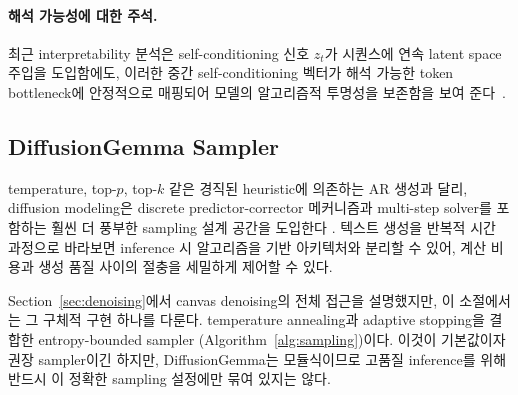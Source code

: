 \documentclass[11pt, a4paper, logo, copyright, gdm]{google}
\begin{document}
\paragraph{해석 가능성에 대한 주석.} 최근 interpretability 분석은 self-conditioning 신호 $z_t$가 시퀀스에 연속 latent space 주입을 도입함에도, 이러한 중간 self-conditioning 벡터가 해석 가능한 token bottleneck에 안정적으로 매핑되어 모델의 알고리즘적 투명성을 보존함을 보여 준다~\citep{engels2026how, asaria2026neither}.


\subsection{DiffusionGemma Sampler}
\label{sec:sampling}

temperature, top-$p$, top-$k$ 같은 경직된 heuristic에 의존하는 AR 생성과 달리, diffusion modeling은 discrete predictor-corrector 메커니즘과 multi-step solver를 포함하는 훨씬 더 풍부한 sampling 설계 공간을 도입한다 \citep{lezama2023predictor, deschenaux2026diffusion, liu2026nisampling, yao2026accelerating, ren2025fast}. 텍스트 생성을 반복적 시간 과정으로 바라보면 inference 시 알고리즘을 기반 아키텍처와 분리할 수 있어, 계산 비용과 생성 품질 사이의 절충을 세밀하게 제어할 수 있다.

Section~\ref{sec:denoising}에서 canvas denoising의 전체 접근을 설명했지만, 이 소절에서는 그 구체적 구현 하나를 다룬다. temperature annealing과 adaptive stopping을 결합한 entropy-bounded sampler \citep{ben2026accelerated}(Algorithm~\ref{alg:sampling})이다. 이것이 기본값이자 권장 sampler이긴 하지만, DiffusionGemma는 모듈식이므로 고품질 inference를 위해 반드시 이 정확한 sampling 설정에만 묶여 있지는 않다.
\end{document}
